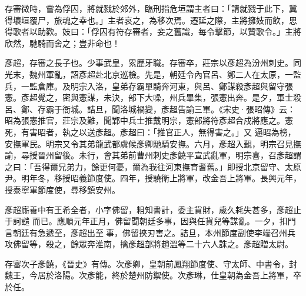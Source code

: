 \begin{pinyinscope}
 存審微時，嘗為俘囚，將就戮於郊外，臨刑指危垣謂主者曰：「請就戮于此下，冀得壞垣覆尸，旅魂之幸也。」主者哀之，為移次焉。遷延之際，主將擁妓而飲，思得歌者以助歡。妓曰：「俘囚有符存審者，妾之舊識，每令擊節，以贊歌令。」主將欣然，馳騎而舍之；豈非命也！



 彥超，存審之長子也。少事武皇，累歷牙職。存審卒，莊宗以彥超為汾州刺史。同光末，魏州軍亂，詔彥超赴北京巡檢。先是，朝廷令內官呂、鄭二人在太原，一監兵，一監倉庫。及明宗入洛，皇弟存霸單騎奔河東，與呂、鄭謀殺彥超與留守張憲。彥超覺之，密與憲謀，未決，部下大噪，州兵畢集，張憲出奔。是夕，軍士殺呂、鄭、存霸于衙城。詰旦，聞洛城禍變，彥超告諭三軍。《宋史·張昭傳》云：昭為張憲推官，莊宗及難，聞鄴中兵士推戴明宗，憲部將符彥超合戍將應之。憲死，有害昭者，執之以送彥超。彥超曰：「推官正人，無得害之。」又
 逼昭為榜，安撫軍民。明宗又令其弟龍武都虞候彥卿馳騎安撫。六月，彥超入覲，明宗召見撫諭，尋授晉州留後。未行，會其弟前曹州刺史彥饒平宣武亂軍，明宗喜，召彥超謂之曰：「吾得爾兄弟力，餘更何憂，爾為我往河東撫育耆舊。」即授北京留守、太原尹。明年冬，移授昭義節度使。四年，授驍衛上將軍，改金吾上將軍。長興元年，授泰寧軍節度使，尋移鎮安州。



 彥超廝養中有王希全者，小字佛留，粗知書計，委主貨財，歲久耗失甚多，彥超止于訶譴
 而已。應順元年正月，佛留聞朝廷多事，因與任貨兒等謀亂。一夕，扣門言朝廷有急遞至，彥超出至事，佛留挾刃害之。詰旦，本州節度副使李端召州兵攻佛留等，殺之，餘眾奔淮南，擒彥超部將趙溫等二十六人誅之。彥超贈太尉。



 存審次子彥饒，《晉史》有傳。次彥卿，皇朝前鳳翔節度使、守太師、中書令，封魏王，今居於洛陽。次彥能，終於楚州防禦使。次彥琳，仕皇朝為金吾上將軍，卒於任。



\end{pinyinscope}
